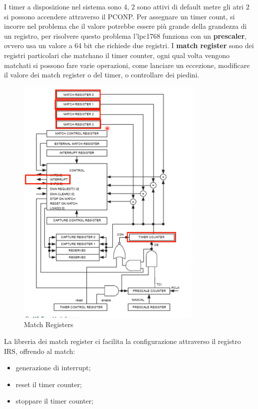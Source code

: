 \documentclass[12pt]{article}
\begin{document}
I timer a disposizione nel sistema sono 4, 2 sono attivi di default metre gli atri 2 si possono accendere attraverso il PCONP. Per assegnare un timer count, si incorre nel problema che il valore potrebbe essere pi\`u grande della grandezza di un registro, per risolvere questo problema l'lpc1768 funziona con un \textbf{prescaler}, ovvero usa un valore a 64 bit che richiede due registri. I \textbf{match register} sono dei registri particolari che matchano il timer counter, ogni qual volta vengono matchati si possono fare varie operazioni, come lanciare un eccezione, modificare il valore dei match register o del timer, o controllare dei piedini.
\begin{figure}[H]
    \centering
    \includegraphics[width=0.8\textwidth]{match-registers.png}
    \caption{Match Registers}
    \label{fig:match-registers}
\end{figure}
La libreria dei match register ci facilita la configurazione attraverso il registro IRS, offrendo al match:
\begin{itemize}
    \item generazione di interrupt;
    \item reset il timer counter;
    \item stoppare il timer counter;
\end{itemize}
\end{document}
